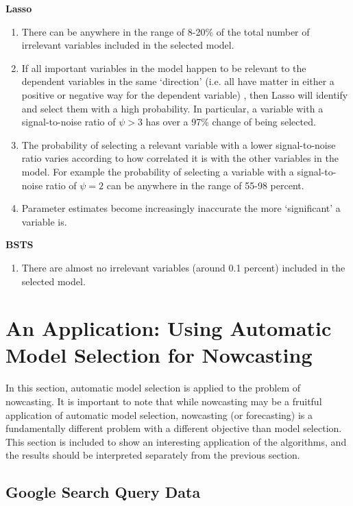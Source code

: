 \documentclass[11pt, oneside]{book}   	%
\begin{document}
\textbf{Lasso}
\begin{enumerate}
\item There can be anywhere in the range of 8-20\% of the total number of irrelevant variables included in the selected model.
\item If all important variables in the model happen to be relevant to the dependent variables in the same `direction' (i.e. all have matter in either a positive or negative way for the dependent variable) , then Lasso will identify and select them with a high probability. In particular, a variable with a signal-to-noise ratio of $\psi>3$ has over a 97\% change of being selected.
\item The probability of selecting a relevant variable with a lower signal-to-noise ratio varies according to how correlated it is with the other variables in the model. For example the probability of selecting a variable with a signal-to-noise ratio of $\psi=2$ can be anywhere in the range of 55-98 percent. 
\item Parameter estimates become increasingly inaccurate the more `significant' a variable is.
\end{enumerate}

\textbf{BSTS}
\begin{enumerate}
\item There are almost no irrelevant variables (around 0.1 percent) included in the selected model.
\end{enumerate}






 

 

\chapter{An Application: Using Automatic Model Selection for Nowcasting}

In this section, automatic model selection is applied to the problem of nowcasting. It is important to note that while nowcasting may be a fruitful application of automatic model selection, nowcasting (or forecasting) is a fundamentally different problem with a different objective than model selection. This section is included to show an interesting application of the algorithms, and the results should be interpreted separately from the previous section. 

\section{Google Search Query Data}
\end{document}
